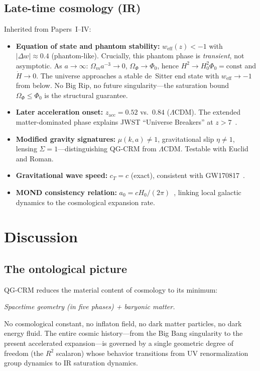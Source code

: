 \documentclass[aps,prd,twocolumn,superscriptaddress,nofootinbib]{revtex4-2}
\begin{document}
\subsection{Late-time cosmology (IR)}

Inherited from Papers~I--IV:
\begin{itemize}
\item \textbf{Equation of state and phantom stability:} $w_\mathrm{eff}(z) < -1$ with $|\Delta w| \approx 0.4$ (phantom-like). Crucially, this phantom phase is \textit{transient}, not asymptotic. As $a \to \infty$: $\Omega_m a^{-3} \to 0$, $\Omega_\Phi \to \Phi_0$, hence $H^2 \to H_0^2\Phi_0 = \mathrm{const}$ and $\dot{H} \to 0$. The universe approaches a stable de~Sitter end state with $w_\mathrm{eff} \to -1$ from below. No Big Rip, no future singularity---the saturation bound $\Omega_\Phi \leq \Phi_0$ is the structural guarantee.
\item \textbf{Later acceleration onset:} $z_\mathrm{acc} = 0.52$ vs.\ $0.84$ ($\Lambda$CDM). The extended matter-dominated phase explains JWST ``Universe Breakers'' at $z > 7$~\cite{Labbe2023}.
\item \textbf{Modified gravity signatures:} $\mu(k,a) \neq 1$, gravitational slip $\eta \neq 1$, lensing $\Sigma = 1$---distinguishing QG-CRM from $\Lambda$CDM. Testable with Euclid and Roman.
\item \textbf{Gravitational wave speed:} $c_T = c$ (exact), consistent with GW170817~\cite{GW170817}.
\item \textbf{MOND consistency relation:} $a_0 = cH_0/(2\pi)$~\cite{Milgrom1983}, linking local galactic dynamics to the cosmological expansion rate.
\end{itemize}


\section{Discussion}
\label{sec:discussion}

\subsection{The ontological picture}

QG-CRM reduces the material content of cosmology to its minimum:
\begin{center}
\textit{Spacetime geometry (in five phases) + baryonic matter.}
\end{center}
No cosmological constant, no inflaton field, no dark matter particles, no dark energy fluid. The entire cosmic history---from the Big Bang singularity to the present accelerated expansion---is governed by a single geometric degree of freedom (the $R^2$ scalaron) whose behavior transitions from UV renormalization group dynamics to IR saturation dynamics.
\end{document}
